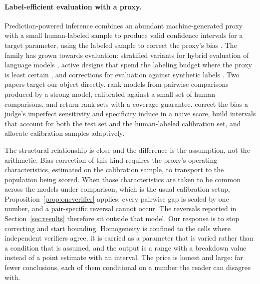 \paragraph{Label-efficient evaluation with a proxy.}
Prediction-powered inference combines an abundant machine-generated proxy with a small
human-labeled sample to produce valid confidence intervals for a target parameter, using the
labeled sample to correct the proxy's bias \citep{angelopoulos2023ppi}. The family has grown
towards evaluation: stratified variants for hybrid evaluation of language models
\citep{fisch2024stratified}, active designs that spend the labeling budget where the proxy is
least certain \citep{zrnic2024active}, and corrections for evaluation against synthetic labels
\citep{boyeau2025autoeval}. Two papers target our object directly.
\citet{chatzi2024ranking} rank models from pairwise comparisons produced by a strong model,
calibrated against a small set of human comparisons, and return rank sets with a coverage
guarantee. \citet{lee2026judge} correct the bias a judge's imperfect sensitivity and
specificity induce in a naive score, build intervals that account for both the test set and
the human-labeled calibration set, and allocate calibration samples adaptively.

The structural relationship is close and the difference is the assumption, not the
arithmetic. Bias correction of this kind requires the proxy's operating characteristics,
estimated on the calibration sample, to transport to the population being scored. When those
characteristics are taken to be common across the models under comparison, which is the usual
calibration setup, Proposition~\ref{prop:oneverifier} applies: every pairwise gap is scaled by
one number, and a pair-specific reversal cannot occur. The reversals reported in
Section~\ref{sec:results} therefore sit outside that model. Our response is to stop correcting
and start bounding. Homogeneity is confined to the cells where independent verifiers agree,
it is carried as a parameter that is varied rather than a condition that is assumed, and the
output is a range with a breakdown value instead of a point estimate with an interval. The
price is honest and large: far fewer conclusions, each of them conditional on a number the
reader can disagree with.

